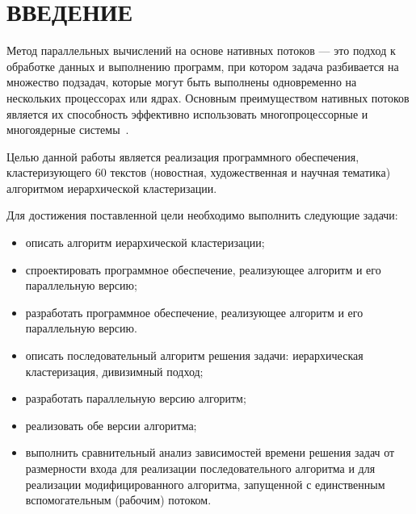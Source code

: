 \chapter*{ВВЕДЕНИЕ}

Метод параллельных вычислений на основе нативных потоков --- это подход к обработке данных и выполнению программ, при котором задача разбивается на множество подзадач, которые могут быть выполнены одновременно на нескольких процессорах или ядрах.
Основным преимуществом нативных потоков является их способность эффективно использовать многопроцессорные и многоядерные системы~\cite{grama2003introduction}. 

Целью данной работы является реализация программного обеспечения,
кластеризующего 60 текстов (новостная, художественная и научная тематика)
алгоритмом иерархической кластеризации.

Для достижения поставленной цели необходимо выполнить следующие задачи:
\begin{itemize}
	\item описать алгоритм иерархической кластеризации;
	\item спроектировать программное обеспечение, реализующее алгоритм и его
	параллельную версию;
	\item разработать программное обеспечение, реализующее алгоритм и его
	параллельную версию.
\end{itemize}


\begin{itemize}
	\item описать последовательный алгоритм решения задачи: иерархическая кластеризация, дивизимный подход;
	\item разработать параллельную версию алгоритм;
	\item реализовать обе версии алгоритма;
	\item выполнить сравнительный анализ зависимостей времени решения задач от размерности входа для реализации последовательного алгоритма и для реализации модифицированного алгоритма, запущенной с единственным вспомогательным (рабочим) потоком.
\end{itemize}
\fi